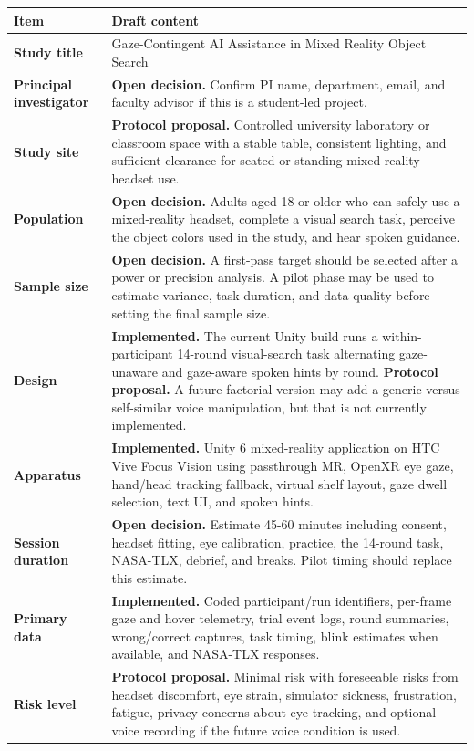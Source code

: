 \documentclass[11pt,letterpaper]{article}
\newcommand{\status}[1]{\textbf{#1.}}
\newcommand{\field}[1]{\textbf{#1}}
\begin{document}
\begin{longtable}{p{}p{}}
\toprule
\field{Item} & \field{Draft content} \\
\midrule
\field{Study title} & Gaze-Contingent AI Assistance in Mixed Reality Object Search \\
\field{Principal investigator} & \status{Open decision} Confirm PI name, department, email, and faculty advisor if this is a student-led project. \\
\field{Study site} & \status{Protocol proposal} Controlled university laboratory or classroom space with a stable table, consistent lighting, and sufficient clearance for seated or standing mixed-reality headset use. \\
\field{Population} & \status{Open decision} Adults aged 18 or older who can safely use a mixed-reality headset, complete a visual search task, perceive the object colors used in the study, and hear spoken guidance. \\
\field{Sample size} & \status{Open decision} A first-pass target should be selected after a power or precision analysis. A pilot phase may be used to estimate variance, task duration, and data quality before setting the final sample size. \\
\field{Design} & \status{Implemented} The current Unity build runs a within-participant 14-round visual-search task alternating gaze-unaware and gaze-aware spoken hints by round. \status{Protocol proposal} A future factorial version may add a generic versus self-similar voice manipulation, but that is not currently implemented. \\
\field{Apparatus} & \status{Implemented} Unity 6 mixed-reality application on HTC Vive Focus Vision using passthrough MR, OpenXR eye gaze, hand/head tracking fallback, virtual shelf layout, gaze dwell selection, text UI, and spoken hints. \\
\field{Session duration} & \status{Open decision} Estimate 45-60 minutes including consent, headset fitting, eye calibration, practice, the 14-round task, NASA-TLX, debrief, and breaks. Pilot timing should replace this estimate. \\
\field{Primary data} & \status{Implemented} Coded participant/run identifiers, per-frame gaze and hover telemetry, trial event logs, round summaries, wrong/correct captures, task timing, blink estimates when available, and NASA-TLX responses. \\
\field{Risk level} & \status{Protocol proposal} Minimal risk with foreseeable risks from headset discomfort, eye strain, simulator sickness, frustration, fatigue, privacy concerns about eye tracking, and optional voice recording if the future voice condition is used. \\
\bottomrule
\end{longtable}
\end{document}
